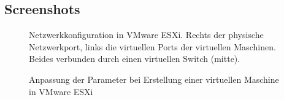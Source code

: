\subsection{Screenshots}
\label{Screenshots}

\begin{figure}[htb]
\centering
{}
\caption{Netzwerkkonfiguration in VMware ESXi. Rechts der physische Netzwerkport, links die virtuellen Ports der virtuellen Maschinen. Beides verbunden durch einen virtuellen Switch (mitte).}
\label{screen:vmnetwork}
\end{figure}

\begin{figure}[htb]
\centering
{}
\caption{Anpassung der Parameter bei Erstellung einer virtuellen Maschine in VMware ESXi}
\label{screen:vmcreation}
\end{figure}



